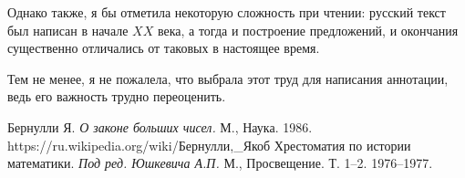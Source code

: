 \documentclass[12pt]{extarticle}
\begin{document}
Однако также, я бы отметила некоторую сложность при чтении: русский текст был написан в начале $XX$ века, а тогда и построение предложений, и окончания существенно отличались от таковых в настоящее время.

Тем не менее, я не пожалела, что выбрала этот труд для написания аннотации, ведь его важность трудно переоценить.
 
\newpage
\begin{thebibliography}{99}
 Бернулли Я. \textit{О законе больших чисел.} М., Наука. 1986.
 https://ru.wikipedia.org/wiki/Бернулли,\_Якоб
 Хрестоматия по истории математики. \textit{Под ред. Юшкевича А.П.} М., Просвещение. Т. 1–2. 1976–1977.

\end{thebibliography}
\end{document}
